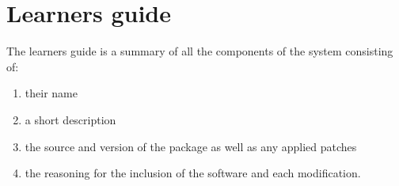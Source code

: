 \section{Learners guide}\label{Learners guide}

The learners guide is a summary of all the components of the system consisting of:

\begin{enumerate}
    \item their name
    \item a short description
    \item the source and version of the package as well as any applied patches
    \item the reasoning for the inclusion of the software and each modification.
\end{enumerate}
